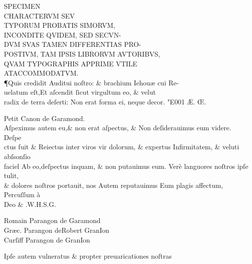 \documentclass{article}
\newcommand{\threecolumntypefacenames}[3]{\begin{multicols}{3}
		\tiny
		\hfill \qquad \qquad \qquad \qquad #1\hspace*{\fill}\\
		\columnbreak
		\hfill #2\hspace*{\fill}\\
		\columnbreak
		\hfill #3\qquad \qquad \qquad \qquad \hspace*{\fill}
\end{multicols}}
\begin{document}
\centering
{{
		\fontsize{19}{16}\selectfont  SPECIMEN \\
		\fontsize{41}{33}\selectfont CHARACTERVM SEV \\
		\fontsize{23}{25}\selectfont TYPORUM PROBATIS SIMORVM\kern-3pt, \\
		\fontsize{19}{17}\selectfont INCONDITE QVIDEM, SED SECVN\kern-3pt-\\
		\fontsize{14}{16}\selectfont DVM SVAS TAMEN DIFFERENTIAS PRO\kern-2pt- \\
		\fontsize{9.5}{11.5}\selectfont POSTIVM, TAM IPSIS LIBRORVM AVTORIBVS\kern-2pt,\\
		\fontsize{7}{9}\selectfont QVAM TYPOGRAPHIS APPRIME VTILE\\
		\fontsize{5}{4}\selectfont AT\quad ACCOMMODATVM.\\}
\justifying
\huge
\noindent \P \quad Quis credidit Auditui noſtro: \& brachium Iehou\ae{} cui Re-\\
uelatum eſt,Et aſcendit ſicut virgultum  eo, \& velut\\
radix de terra deſerti: Non erat forma ei, neque decor. \char"E001{} \AE{}. \OE .

\small
\centering
Petit Canon de Garamond.\\
\vspace{-0.5\baselineskip}
\Large
\justifying
Aſpeximus autem eu,\& non erat aſpectus, \& Non deſiderauimus eum videre. Deſpe \\
ctus fuit \& Reiectus inter viros vir dolorum, \& expertus Infirmitatem, \& veluti abſsonſio \\
faciel Ab eo,deſpectus inquam, \& non putauimus eum. Ver\`e languores noſtros ipſe tulit, \\
\& dolores noſtros portauit, nos Autem reputauimus Eum plagis affectum, Percuſſum \`a\\
\centering
Deo \& .\quad  W.\quad H.\quad S.\quad G.\quad \\
\vspace{-\baselineskip}
\threecolumntypefacenames{Romain Parangon de Garamond}{Gr\ae{}c. Parangon deRobert GranIon\quad \quad \quad \quad \quad \quad \quad \quad }{Curſiff Parangon de GranIon}
\vspace*{-\baselineskip}
\scriptsize
\begin{multicols}{2}
	\justifying
	\normalsize
	\justifying
	{Ipſe autem vulneratus \& propter preuaricationes noſtras\linebreak}


\end{multicols}}
\end{document}
